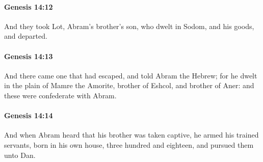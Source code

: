 		\paragraph{Genesis 14:12} %
			\label{GENESIS-14-12}

			And they took Lot, Abram's brother's son, who dwelt in Sodom, and his goods, and departed.


		\paragraph{Genesis 14:13} %
			\label{GENESIS-14-13}

			And there came one that had escaped, and told Abram the Hebrew; for he dwelt in the plain of Mamre the Amorite, brother of Eshcol, and brother of Aner: and these were confederate with Abram.


		\paragraph{Genesis 14:14} %
			\label{GENESIS-14-14}

			And when Abram heard that his brother was taken captive, he armed his trained servants, born in his own house, three hundred and eighteen, and pursued them unto Dan.


